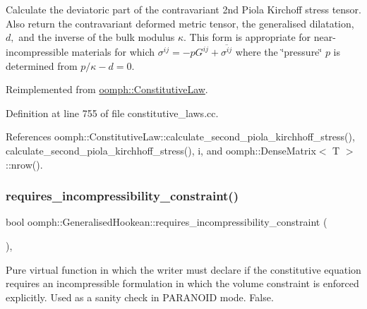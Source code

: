 Calculate the deviatoric part of the contravariant 2nd Piola Kirchoff stress tensor. Also return the contravariant deformed metric tensor, the generalised dilatation, $ d, $ and the inverse of the bulk modulus $ \kappa$. This form is appropriate for near-\/incompressible materials for which $ \sigma^{ij} = -p G^{ij} + \overline{ \sigma^{ij}} $ where the \char`\"{}pressure\char`\"{} $ p $ is determined from $ p / \kappa - d =0 $. 

Reimplemented from \hyperlink{classoomph_1_1ConstitutiveLaw_a26f34355b626bebcad8f498fa5271d20}{oomph\+::\+Constitutive\+Law}.



Definition at line 755 of file constitutive\+\_\+laws.\+cc.



References oomph\+::\+Constitutive\+Law\+::calculate\+\_\+second\+\_\+piola\+\_\+kirchhoff\+\_\+stress(), calculate\+\_\+second\+\_\+piola\+\_\+kirchhoff\+\_\+stress(), i, and oomph\+::\+Dense\+Matrix$<$ T $>$\+::nrow().

\mbox{\label{classoomph_1_1GeneralisedHookean_a9ed467d8b7c838cb7fed8c861aa652e9}} 
\subsubsection{\texorpdfstring{requires\+\_\+incompressibility\+\_\+constraint()}{requires\_incompressibility\_constraint()}}
{\footnotesize\ttfamily bool oomph\+::\+Generalised\+Hookean\+::requires\+\_\+incompressibility\+\_\+constraint (\begin{DoxyParamCaption}{ }\end{DoxyParamCaption})\hspace{0.3cm}{\ttfamily [inline]}, {\ttfamily [virtual]}}



Pure virtual function in which the writer must declare if the constitutive equation requires an incompressible formulation in which the volume constraint is enforced explicitly. Used as a sanity check in P\+A\+R\+A\+N\+O\+ID mode. False. 



